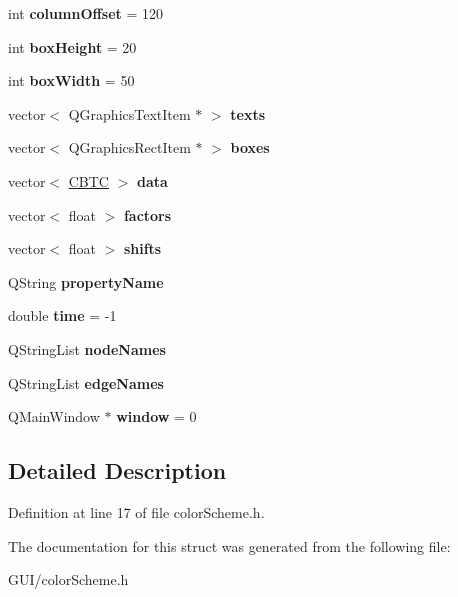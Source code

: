 \begin{DoxyCompactItemize}
int {\bfseries column\+Offset} = 120
\item 
\mbox{\label{structcolorlegend_a978cd0b231ab3026c52155e905fa99f4}} 
int {\bfseries box\+Height} = 20
\item 
\mbox{\label{structcolorlegend_ab104bbb6e75a8224bfe6fa97e55f75c8}} 
int {\bfseries box\+Width} = 50
\item 
\mbox{\label{structcolorlegend_aa82643d32fdc09a7138168b25650d4d5}} 
vector$<$ Q\+Graphics\+Text\+Item $\ast$ $>$ {\bfseries texts}
\item 
\mbox{\label{structcolorlegend_af3a7a4a4717dbf09634dd0b775d68382}} 
vector$<$ Q\+Graphics\+Rect\+Item $\ast$ $>$ {\bfseries boxes}
\item 
\mbox{\label{structcolorlegend_a2d07ebf096d09afd38a2ab5962b51fa4}} 
vector$<$ \hyperlink{class_c_b_t_c}{C\+B\+TC} $>$ {\bfseries data}
\item 
\mbox{\label{structcolorlegend_a5fbd02f6682cd086b2f205afaeb5c6b3}} 
vector$<$ float $>$ {\bfseries factors}
\item 
\mbox{\label{structcolorlegend_a6b92b1772c99d9c62a38e15ecbab3d88}} 
vector$<$ float $>$ {\bfseries shifts}
\item 
\mbox{\label{structcolorlegend_a1dbab87eeb1956771d44733fc31a38f3}} 
Q\+String {\bfseries property\+Name}
\item 
\mbox{\label{structcolorlegend_a16d7e9722de4a15ba3641a774bfe117c}} 
double {\bfseries time} = -\/1
\item 
\mbox{\label{structcolorlegend_a3c996cfda5b8c7050e37858d61f736db}} 
Q\+String\+List {\bfseries node\+Names}
\item 
\mbox{\label{structcolorlegend_ab6cc5895b787bd837aa71f1f27764dc5}} 
Q\+String\+List {\bfseries edge\+Names}
\item 
\mbox{\label{structcolorlegend_a39b72fac8cb22920a0b67cc97abbf969}} 
Q\+Main\+Window $\ast$ {\bfseries window} = 0
\end{DoxyCompactItemize}


\subsection{Detailed Description}


Definition at line 17 of file color\+Scheme.\+h.



The documentation for this struct was generated from the following file\+:\begin{DoxyCompactItemize}
\item 
G\+U\+I/color\+Scheme.\+h\end{DoxyCompactItemize}
